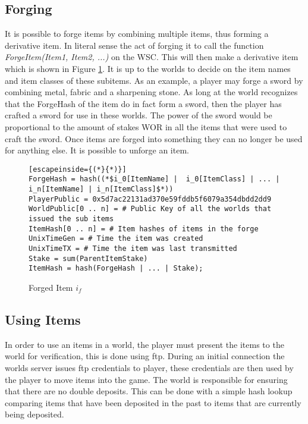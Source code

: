 \documentclass[runningheads,a4paper]{llncs}
\begin{document}
\subsection{Forging}
\label{Forging}
It is possible to forge items by combining multiple items, thus forming a derivative item. In literal sense the act of forging it to call the function \textit{ForgeItem(Item1, Item2, ...)} on the WSC. This will then make a derivative item which is shown in Figure \ref{ForgedItem}. It is up to the worlds to decide on the item names and item classes of these subitems. As an example, a player may forge a sword by combining metal, fabric and a sharpening stone. As long at the world recognizes that the ForgeHash of the item do in fact form a sword, then the player has crafted a sword for use in these worlds. The power of the sword would be proportional to the amount of stakes WOR in all the items that were used to craft the sword. Once items are forged into something they can no longer be used for anything else. It is possible to unforge an item.

\begin{figure}[H]
\centering
\caption{Forged Item $i_f$}
\label{ForgedItem}
\begin{lstlisting}[escapeinside={(*}{*)}]
ForgeHash = hash((*$i_0[ItemName] |  i_0[ItemClass] | ... | i_n[ItemName] | i_n[ItemClass]$*))
PlayerPublic = 0x5d7ac22131ad370e59fddb5f6079a354dbdd2dd9
WorldPublic[0 .. n] = # Public Key of all the worlds that issued the sub items
ItemHash[0 .. n] = # Item hashes of items in the forge
UnixTimeGen = # Time the item was created
UnixTimeTX = # Time the item was last transmitted
Stake = sum(ParentItemStake)
ItemHash = hash(ForgeHash | ... | Stake);
\end{lstlisting}
\end{figure}

\subsection{Using Items}
In order to use an items in a world, the player must present the items to the world for verification, this is done using ftp. During an initial connection the worlds server issues ftp credentials to player, these credentials are then used by the player to move items into the game. The world is responsible for ensuring that there are no double deposits. This can be done with a simple hash lookup comparing items that have been deposited in the past to items that are currently being deposited.
\end{document}
